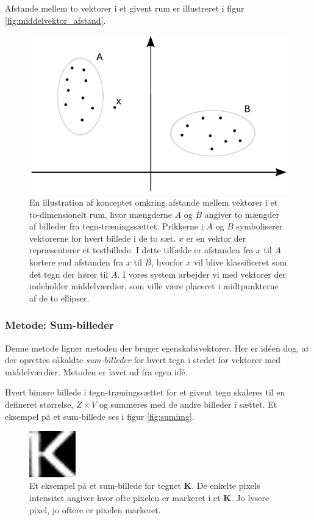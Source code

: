 Afstande mellem to vektorer i et givent rum er illustreret i figur \vref{fig:middelvektor_afstand}.

\begin{figure}[htp]
\centering
\includegraphics{system/illu/middelvektor_afstand.pdf} 
\caption{En illustration af konceptet omkring afstande mellem vektorer i et to-dimensionelt rum, hvor mængderne $A$ og $B$ angiver to mængder af billeder fra tegn-træningssættet. Prikkerne i $A$ og $B$ symboliserer vektorerne for hvert billede i de to sæt. $x$ er en vektor der repræsenterer et testbillede. I dette tilfælde er afstanden fra $x$ til $A$ kortere end afstanden fra $x$ til $B$, hvorfor $x$ vil blive klassificeret som det tegn der hører til $A$. I vores system arbejder vi med vektorer der indeholder middelværdier, som ville være placeret i midtpunkterne af de to ellipser.}
\label{fig:middelvektor_afstand}
\end{figure}

\subsubsection*{Metode: Sum-billeder}

Denne metode ligner metoden der bruger egenskabsvektorer. Her er idéen dog, at der oprettes såkaldte \textit{sum-billeder} for hvert tegn i stedet for vektorer med middelværdier. Metoden er lavet ud fra egen idé.

Hvert binære billede i tegn-træningssættet for et givent tegn skaleres til en defineret størrelse, $Z \times V$ og summeres med de andre billeder i sættet. Et eksempel på et sum-billede ses i figur \vref{fig:sumimg}.

\begin{figure}[htp]
\centering
\includegraphics[width=2cm]{system/illu/sumimg.png} 
\caption{Et eksempel på et sum-billede for tegnet \textbf{K}. De enkelte pixels intensitet angiver hvor ofte pixelen er markeret i et \textbf{K}. Jo lysere pixel, jo oftere er pixelen markeret.}
\label{fig:sumimg}
\end{figure}

